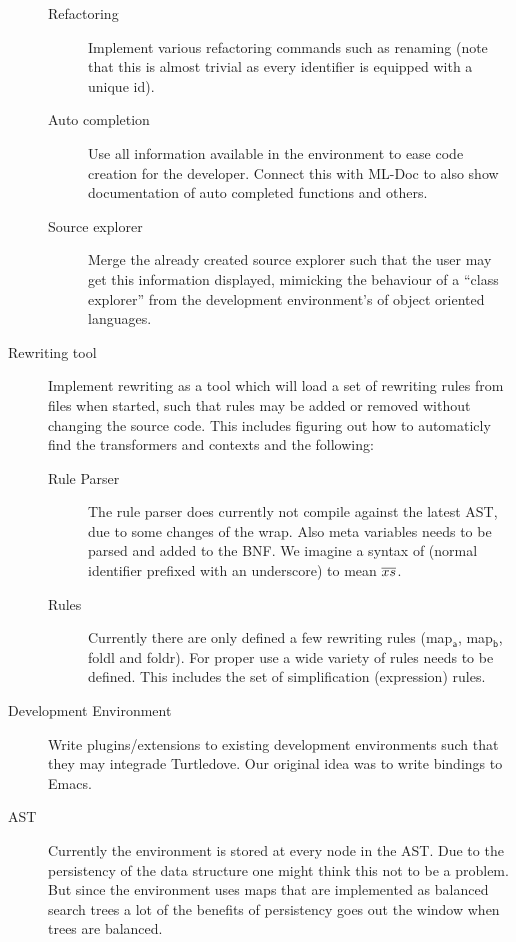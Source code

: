 \begin{description}
\begin{description}
  \item[Refactoring] Implement various refactoring commands such as renaming
    (note that this is almost trivial as every identifier is equipped with a
    unique id).

  \item[Auto completion] Use all information available in the environment to
    ease code creation for the developer. Connect this with ML-Doc to also show
    documentation of auto completed functions and others.

  \item[Source explorer] Merge the already created source explorer such that the
    user may get this information displayed, mimicking the behaviour of a ``class
    explorer'' from the development environment's of object oriented languages. 
  \end{description}

\item[Rewriting tool] Implement rewriting as a tool which will load a set of
  rewriting rules from files when started, such that rules may be added or
  removed without changing the source code. This includes figuring out how to
  automaticly find the transformers and contexts and the following:
  \begin{description}
  \item[Rule Parser] The rule parser does currently not compile against the
    latest AST, due to some changes of the wrap. Also meta variables needs to be
    parsed and added to the BNF. We imagine a syntax of  (normal
    identifier prefixed with an underscore) to mean $\overline{xs}$.

  \item[Rules] Currently there are only defined a few rewriting rules
    (\textsf{map$_\textsf{a}$}, \textsf{map$_\textsf{b}$}, \textsf{foldl} and
    \textsf{foldr}). For proper use a wide variety of rules needs to be
    defined. This includes the set of simplification (expression) rules.
  \end{description}

\item[Development Environment] Write plugins/extensions to existing development
  environments such that they may integrade Turtledove. Our original idea was to
  write bindings to Emacs.

\item[AST] Currently the environment is stored at every node in the AST. Due to
  the persistency of the data structure one might think this not to be a
  problem. But since the environment uses maps that are implemented as balanced
  search trees a lot of the benefits of persistency goes out the window when
  trees are balanced.


\end{description}
